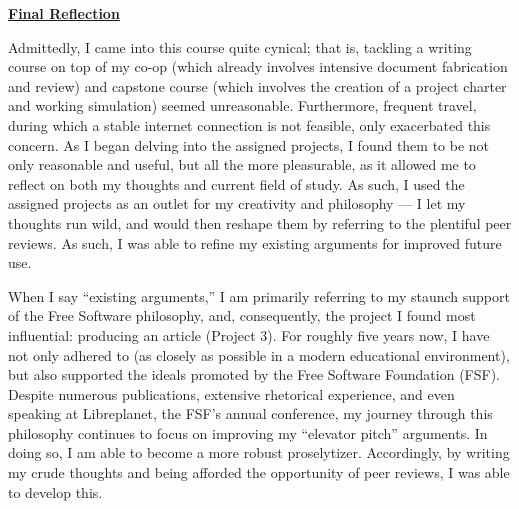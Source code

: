 



\begin{center}

  \textbf{\underline{Final Reflection}}

\end{center}

\begin{justify}

  \hspace{.5in} Admittedly, I came into this course quite cynical; that is, tackling a writing course on top of my co-op (which already involves intensive document fabrication and review) and capstone course (which involves the creation of a project charter and working simulation) seemed unreasonable. Furthermore, frequent travel, during which a stable internet connection is not feasible, only exacerbated this concern. As I began delving into the assigned projects, I found them to be not only reasonable and useful, but all the more pleasurable, as it allowed me to reflect on both my thoughts and current field of study. As such, I used the assigned projects as an outlet for my creativity and philosophy — I let my thoughts run wild, and would then reshape them by referring to the plentiful peer reviews. As such, I was able to refine my existing arguments for improved future use.

  \hspace{.5in} When I say ``existing arguments,'' I am primarily referring to my staunch support of the Free Software philosophy, and, consequently, the project I found most influential: producing an article (Project 3). For roughly five years now, I have not only adhered to (as closely as possible in a modern educational environment), but also supported the ideals promoted by the Free Software Foundation (FSF). Despite numerous publications, extensive rhetorical experience, and even speaking at Libreplanet, the FSF's annual conference, my journey through this philosophy continues to focus on improving my ``elevator pitch'' arguments. In doing so, I am able to become a more robust proselytizer. Accordingly, by writing my crude thoughts and being afforded the opportunity of peer reviews, I was able to develop this.


\end{justify}
